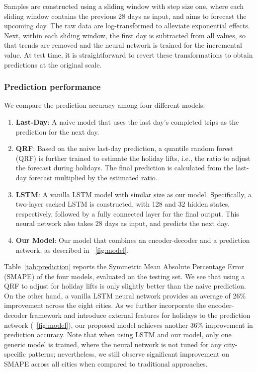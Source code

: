 \documentclass[conference,compsoc,final]{IEEEtran}
\begin{document}
Samples are constructed using a sliding window with step size one, where each sliding window contains the previous 28 days as input, and aims to forecast the upcoming day. The raw data are log-transformed to alleviate exponential effects. Next, within each sliding window, the first day is subtracted from all values, so that trends are removed and the neural network is trained for the incremental value. At test time, it is straightforward to revert these transformations to obtain predictions at the original scale. 


\subsubsection{Prediction performance}

We compare the prediction accuracy among four different models:
\begin{enumerate}
\item {\bf Last-Day}: A naive model that uses the last day's completed trips as the prediction for the next day.
\item {\bf QRF}: Based on the naive last-day prediction, a quantile random forest (QRF) is further trained to estimate the holiday lifts, i.e., the ratio to adjust the forecast during holidays. The final prediction is calculated from the last-day forecast multiplied by the estimated ratio.
\item {\bf LSTM}: A vanilla LSTM model with similar size as our model. Specifically, a two-layer sacked LSTM is constructed, with 128 and 32 hidden states, respectively, followed by a fully connected layer for the final output. This neural network also takes 28 days as input, and predicts the next day.
\item {\bf Our Model}: Our model that combines an encoder-decoder and a prediction network, as described in \figurename~\ref{fig:model}.
\end{enumerate}

Table~\ref{tab:prediction} reports the Symmetric Mean Absolute Percentage Error (SMAPE) of the four models, evaluated on the testing set. We see that using a QRF to adjust for holiday lifts is only slightly better than the naive prediction. On the other hand, a vanilla LSTM neural network provides an average of 26\% improvement across the eight cities. As we further incorporate the encoder-decoder framework and introduce external features for holidays to the prediction network (\figurename~\ref{fig:model}), our proposed model achieves another 36\% improvement in prediction accuracy. Note that when using LSTM and our model, only one generic model is trained, where the neural network is not tuned for any city-specific patterns; nevertheless, we still observe significant improvement on SMAPE across all cities when compared to traditional approaches. 
\end{document}
